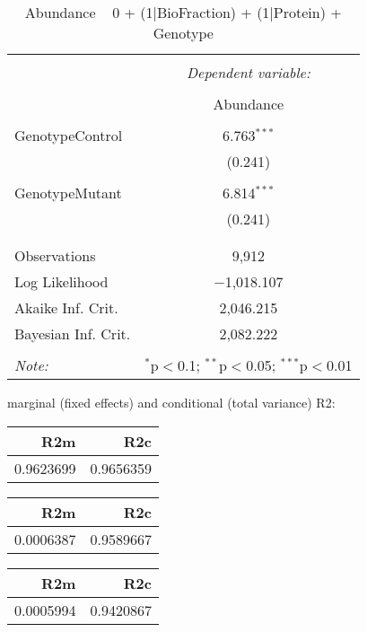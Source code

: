 \documentclass[11pt]{report}
\begin{document}
\begin{table}[!htbp] \centering 
  \caption{Abundance ~ 0 + (1|BioFraction) + (1|Protein) + Genotype} 
  \label{} 
\begin{tabular}{@{\extracolsep{5pt}}lc} 
\\[-1.8ex]\hline 
\hline \\[-1.8ex] 
 & \multicolumn{1}{c}{\textit{Dependent variable:}} \\ 
\cline{2-2} 
\\[-1.8ex] & Abundance \\ 
\hline \\[-1.8ex] 
 GenotypeControl & 6.763$^{***}$ \\ 
  & (0.241) \\ 
  & \\ 
 GenotypeMutant & 6.814$^{***}$ \\ 
  & (0.241) \\ 
  & \\ 
\hline \\[-1.8ex] 
Observations & 9,912 \\ 
Log Likelihood & $-$1,018.107 \\ 
Akaike Inf. Crit. & 2,046.215 \\ 
Bayesian Inf. Crit. & 2,082.222 \\ 
\hline 
\hline \\[-1.8ex] 
\textit{Note:}  & \multicolumn{1}{r}{$^{*}$p$<$0.1; $^{**}$p$<$0.05; $^{***}$p$<$0.01} \\ 
\end{tabular} 
\end{table} 
marginal (fixed effects) and conditional (total variance) R2:

\begin{tabular}{r|r}
\hline
R2m & R2c\\
\hline
0.9623699 & 0.9656359\\
\hline
\end{tabular}

\begin{tabular}{r|r}
\hline
R2m & R2c\\
\hline
0.0006387 & 0.9589667\\
\hline
\end{tabular}

\begin{tabular}{r|r}
\hline
R2m & R2c\\
\hline
0.0005994 & 0.9420867\\
\hline
\end{tabular}
\end{document}
